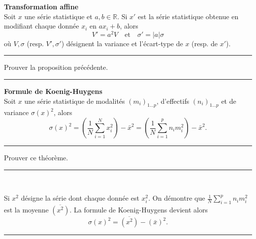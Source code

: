 \documentclass[../PolyS4.tex]{subfiles}
\begin{document}
\begin{Prop}\textbf{Transformation affine}\\

Soit $x$ une série statistique et $a, b \in \mathbb{R}$. Si $x'$ est la série statistique obtenue en modifiant chaque donnée $x_i$ en $ax_i + b$, alors
\[
V' = a^2 V \quad \text{et} \quad \sigma' = |a| \sigma
\]
où $V, \sigma$ (resp. $V', \sigma'$) désignent la variance et l'écart-type de $x$ (resp. de $x'$).
\end{Prop}

\vspace{1em}
\hrule
\vspace{1em}


Prouver la proposition précédente.

\vspace{1em}
\hrule
\vspace{1em}

\begin{Thm}\textbf{Formule de Koenig-Huygens}\\

Soit $x$ une série statistique de modalités $(m_i)_{1 \ldots p}$, d'effectifs $(n_i)_{1 \ldots p}$ et de variance $\sigma(x)^2$, alors
\[
\sigma(x)^2 = \left( \frac{1}{N} \sum_{i=1}^{N} x_i^2 \right) - \bar x^2 = \left( \frac{1}{N} \sum_{i=1}^{p} n_i m_i^2 \right) - \bar x^2.
\]
\end{Thm}

\vspace{1em}
\hrule
\vspace{1em}


Prouver ce théorème.

\vspace{1em}
\hrule
\vspace{1em}

\begin{Rmq}$\,$

Si $x^2$ désigne la série dont chaque donnée est $x_i^2$. On démontre que $\frac{1}{N} \sum_{i=1}^{p} n_i m_i^2$ est la moyenne $\overline{(x^2)}$. La formule de Koenig-Huygens devient alors
\[
\sigma(x)^2 = \overline{(x^2)} - (\bar x)^2.
\]
\end{Rmq}

\vspace{1em}
\hrule
\vspace{1em}
\end{document}
